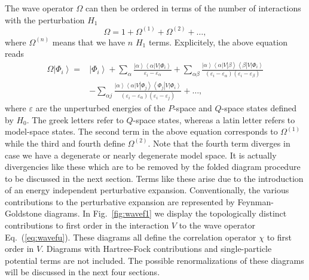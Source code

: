 \documentclass[twoside,12pt]{article}
\begin{document}
The wave operator $\Omega$ can then be ordered in terms of the number
of interactions with the perturbation $H_1$
\begin{equation}
              \Omega = 1 +\Omega^{(1)} + \Omega^{(2)}+\dots ,
\end{equation}
where $\Omega^{(n)}$ means that we have $n$ $H_1$ terms.
Explicitely, the above
equation reads
\begin{eqnarray}
         \Omega\left|\Phi_i\right\rangle=
         &{\displaystyle\left|\Phi_i\right\rangle
         +\sum_{\alpha}\frac{\left|\alpha\right\rangle
         \left\langle\alpha\right|
          V\left|\Phi_i\right\rangle}{\varepsilon_i -\varepsilon_{\alpha}}
         +\sum_{\alpha\beta}\frac{\left|\alpha\right\rangle
        \left\langle\alpha\right| V
         \left|\beta\right\rangle\left\langle\beta\right| V
         \left|\Phi_i\right\rangle }
         {(\varepsilon_i-\varepsilon_{\alpha})
       (\varepsilon_i-\varepsilon_{\beta})} }\\   \label{eq:wavefu}\nonumber
&       {\displaystyle  -\sum_{\alpha j}\frac{\left|\alpha\right\rangle
       \left\langle\alpha\right|
         V\left|\Phi_j\right\rangle
        \left\langle\Phi_j\right| V\left|\Phi_i\right\rangle}
       {(\varepsilon_i-\varepsilon_{\alpha})
      (\varepsilon_i-\varepsilon_{j})} }
       +\dots ,
\end{eqnarray}
where $\varepsilon$ are the unperturbed energies of the $P$-space
and $Q$-space states defined by $H_0$.
The greek letters refer to
$Q$-space states, whereas a latin letter refers to model-space
states.   The second term
in the above equation corresponds to $\Omega^{(1)}$ while the third
and fourth define $\Omega^{(2)}$.
Note that the fourth term diverges
in case we have a degenerate or nearly degenerate model space. It is
actually divergencies like these which are to be removed by the folded
diagram procedure to be discussed in the next section. Terms like these
arise due to the introduction of an energy independent perturbative
expansion. Conventionally, the various contributions to the
perturbative expansion are represented by Feynman-Goldstone diagrams.
In Fig.\ \ref{fig:wavef1} we display the topologically distinct
contributions to first order in the
interaction $V$ to
the wave operator Eq.\ (\ref{eq:wavefu}). These diagrams all
define the correlation operator $\chi$ to first order in $V$.
Diagrams with Hartree-Fock contributions
and single-particle potential terms
are not included. The possible
renormalizations of these diagrams will be discussed
in the next four sections.
\end{document}
